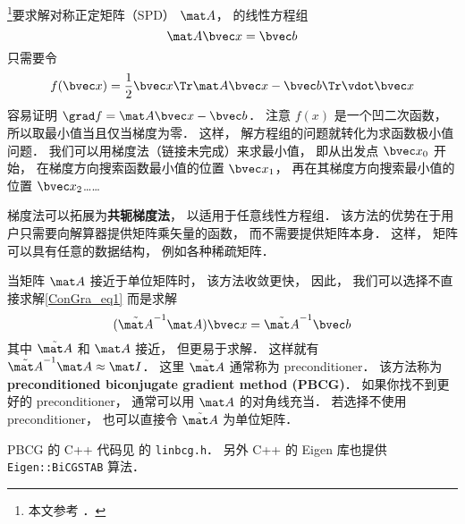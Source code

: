 
\begin{issues}
\issueDraft
\end{issues}


\footnote{本文参考 \cite{NR3}．}要求解对称正定矩阵（SPD） $\mat A$， 的线性方程组
\begin{equation}\label{ConGra_eq1}
\mat A \bvec x = \bvec b
\end{equation}
只需要令
\begin{equation}
f(\bvec x) = \frac{1}{2}\bvec x\Tr \mat A\bvec x - \bvec b\Tr \vdot \bvec x
\end{equation}
容易证明 $\grad f = \mat A \bvec x - \bvec b$． 注意 $f(x)$ 是一个凹二次函数， 所以取最小值当且仅当梯度为零． 这样， 解方程组的问题就转化为求函数极小值问题． 我们可以用梯度法（链接未完成）来求最小值， 即从出发点 $\bvec x_0$ 开始， 在梯度方向搜索函数最小值的位置 $\bvec x_1$， 再在其梯度方向搜索最小值的位置 $\bvec x_2$……

梯度法可以拓展为\textbf{共轭梯度法}， 以适用于任意线性方程组． 该方法的优势在于用户只需要向解算器提供矩阵乘矢量的函数， 而不需要提供矩阵本身． 这样， 矩阵可以具有任意的数据结构， 例如各种稀疏矩阵．

当矩阵 $\mat A$ 接近于单位矩阵时， 该方法收敛更快， 因此， 我们可以选择不直接求解\autoref{ConGra_eq1} 而是求解
\begin{equation}
(\tilde {\mat A}^{-1}\mat A) \bvec x = \tilde {\mat A}^{-1}\bvec b
\end{equation}
其中 $\tilde {\mat A}$ 和 $\mat A$ 接近， 但更易于求解． 这样就有 $\tilde {\mat A}^{-1}\mat A \approx \mat I$． 这里 $\tilde {\mat A}$ 通常称为 preconditioner． 该方法称为 \textbf{preconditioned biconjugate gradient method (PBCG)}． 如果你找不到更好的 preconditioner， 通常可以用 $\mat A$ 的对角线充当． 若选择不使用 preconditioner， 也可以直接令 $\tilde {\mat A}$ 为单位矩阵．

PBCG 的 C++ 代码见 \cite{NR3} 的 \verb|linbcg.h|． 另外 C++ 的 Eigen 库也提供 \verb|Eigen::BiCGSTAB| 算法．

